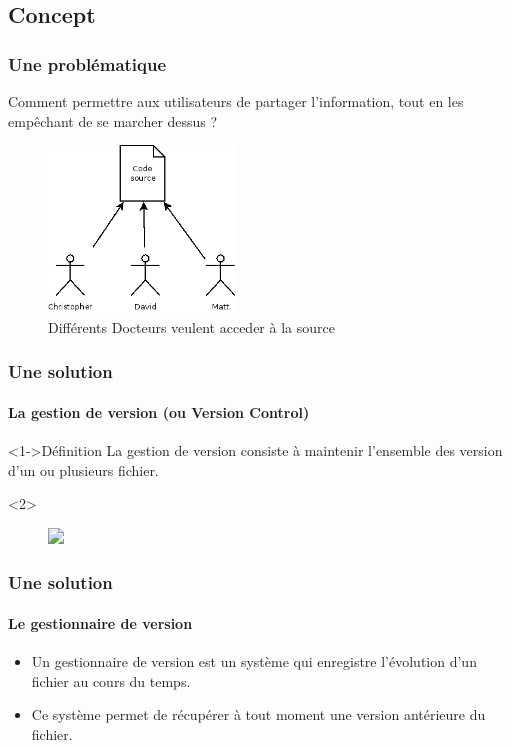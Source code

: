 \subsection{Concept}
\begin{frame}
 \frametitle{Une problématique}
    Comment permettre aux utilisateurs de partager l'information, tout en les empêchant de se marcher dessus ?
    \begin{figure}
 \centering
 \includegraphics[width=50mm]{./Img/AccesConc.png}
 \caption{Différents Docteurs veulent acceder à la source}
\end{figure}


\end{frame}
\begin{frame}
 \frametitle{Une solution}
  \framesubtitle{La gestion de version (ou Version Control)}
    \begin{block}<1->{D\'efinition}
     La gestion de version consiste à maintenir l'ensemble des version d'un ou plusieurs fichier.
    \end{block}

     \begin{exampleblock}<2>{}
      \begin{figure}
 \centering
 \includegraphics<2>[width=50mm]{./Img/VersionsFich.png}
 \caption{}
\end{figure}
     \end{exampleblock}
 
     


    
\end{frame}

\begin{frame}
\frametitle{Une solution}
  \framesubtitle{Le gestionnaire de version}
  \begin{itemize}
   \item <1->  Un gestionnaire de version est un système qui enregistre l'évolution d'un fichier au cours du temps.
   \item <2-> Ce système permet de récupérer à tout moment une version antérieure du fichier.
  \end{itemize}

\end{frame}

